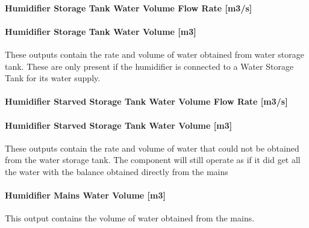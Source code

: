 \paragraph{Humidifier Storage Tank Water Volume Flow Rate {[}m3/s{]}}\label{humidifier-storage-tank-water-volume-flow-rate-m3s-1}

\paragraph{Humidifier Storage Tank Water Volume {[}m3{]}}\label{humidifier-storage-tank-water-volume-m3-1}

These outputs contain the rate and volume of water obtained from water storage tank. These are only present if the humidifier is connected to a Water Storage Tank for its water supply.

\paragraph{Humidifier Starved Storage Tank Water Volume Flow Rate {[}m3/s{]}}\label{humidifier-starved-storage-tank-water-volume-flow-rate-m3s-1}

\paragraph{Humidifier Starved Storage Tank Water Volume {[}m3{]}}\label{humidifier-starved-storage-tank-water-volume-m3-1}

These outputs contain the rate and volume of water that could not be obtained from the water storage tank. The component will still operate as if it did get all the water with the balance obtained directly from the mains

\paragraph{Humidifier Mains Water Volume {[}m3{]}}\label{humidifier-mains-water-volume-m3-1}

This output contains the volume of water obtained from the mains.
